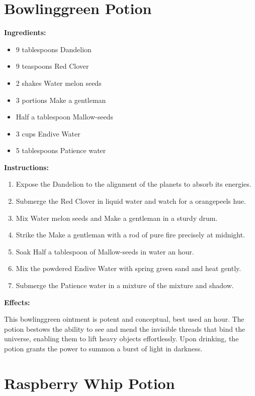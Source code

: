 \documentclass{article}
\begin{document}
\newpage
\section*{Bowlinggreen Potion}

\textbf{Ingredients:}

\begin{itemize}
  \item 9 tablespoons Dandelion
  \item 9 teaspoons Red Clover
  \item 2 shakes Water melon seeds
  \item 3 portions Make a gentleman
  \item Half a tablespoon Mallow-seeds
  \item 3 cups Endive Water
  \item 5 tablespoons Patience water
\end{itemize}

\textbf{Instructions:}

\begin{enumerate}
  \item Expose the Dandelion to the alignment of the planets to absorb its energies.
  \item Submerge the Red Clover in liquid water and watch for a orangepeels hue.
  \item Mix Water melon seeds and Make a gentleman in a sturdy drum.
  \item Strike the Make a gentleman with a rod of pure fire precisely at midnight.
  \item Soak Half a tablespoon of Mallow-seeds in water an hour.
  \item Mix the powdered Endive Water with spring green sand and heat gently.
  \item Submerge the Patience water in a mixture of the mixture and shadow.
\end{enumerate}

\textbf{Effects:}

This bowlinggreen ointment is potent and conceptual, best used an hour. The potion bestows the ability to see and mend the invisible threads that bind the universe, enabling them to lift heavy objects effortlessly. Upon drinking, the potion grants the power to summon a burst of light in darkness.

\newpage
\section*{Raspberry Whip Potion}
\end{document}
